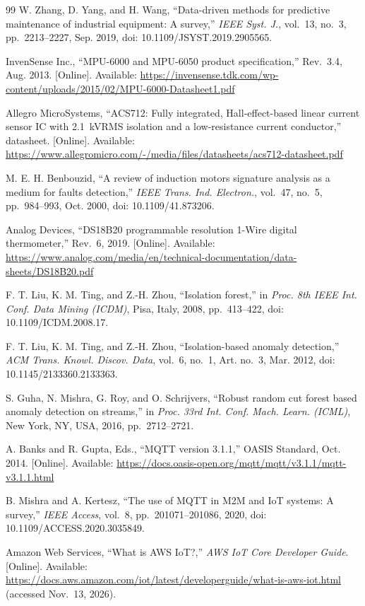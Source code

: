 \documentclass[10pt,twocolumn]{article}
\begin{document}
\begin{thebibliography}{99}
W. Zhang, D. Yang, and H. Wang, ``Data-driven methods for predictive maintenance of industrial
equipment: A survey,'' \emph{IEEE Syst. J.}, vol.~13, no.~3, pp.~2213--2227, Sep. 2019,
doi: 10.1109/JSYST.2019.2905565.

InvenSense Inc., ``MPU-6000 and MPU-6050 product specification,'' Rev.~3.4, Aug. 2013. [Online].
Available: \url{https://invensense.tdk.com/wp-content/uploads/2015/02/MPU-6000-Datasheet1.pdf}

Allegro MicroSystems, ``ACS712: Fully integrated, Hall-effect-based linear current sensor IC with
2.1~kVRMS isolation and a low-resistance current conductor,'' datasheet. [Online]. Available:
\url{https://www.allegromicro.com/-/media/files/datasheets/acs712-datasheet.pdf}

M. E. H. Benbouzid, ``A review of induction motors signature analysis as a medium for faults
detection,'' \emph{IEEE Trans. Ind. Electron.}, vol.~47, no.~5, pp.~984--993, Oct. 2000,
doi: 10.1109/41.873206.

Analog Devices, ``DS18B20 programmable resolution 1-Wire digital thermometer,'' Rev.~6, 2019.
[Online]. Available:
\url{https://www.analog.com/media/en/technical-documentation/data-sheets/DS18B20.pdf}

F. T. Liu, K. M. Ting, and Z.-H. Zhou, ``Isolation forest,'' in \emph{Proc. 8th IEEE Int. Conf.
Data Mining (ICDM)}, Pisa, Italy, 2008, pp.~413--422, doi: 10.1109/ICDM.2008.17.

F. T. Liu, K. M. Ting, and Z.-H. Zhou, ``Isolation-based anomaly detection,'' \emph{ACM Trans.
Knowl. Discov. Data}, vol.~6, no.~1, Art. no.~3, Mar. 2012, doi: 10.1145/2133360.2133363.

S. Guha, N. Mishra, G. Roy, and O. Schrijvers, ``Robust random cut forest based anomaly detection
on streams,'' in \emph{Proc. 33rd Int. Conf. Mach. Learn. (ICML)}, New York, NY, USA, 2016,
pp.~2712--2721.

A. Banks and R. Gupta, Eds., ``MQTT version 3.1.1,'' OASIS Standard, Oct. 2014. [Online].
Available: \url{https://docs.oasis-open.org/mqtt/mqtt/v3.1.1/mqtt-v3.1.1.html}

B. Mishra and A. Kertesz, ``The use of MQTT in M2M and IoT systems: A survey,'' \emph{IEEE
Access}, vol.~8, pp.~201071--201086, 2020, doi: 10.1109/ACCESS.2020.3035849.

Amazon Web Services, ``What is AWS IoT?,'' \emph{AWS IoT Core Developer Guide}. [Online].
Available: \url{https://docs.aws.amazon.com/iot/latest/developerguide/what-is-aws-iot.html}
(accessed Nov.~13, 2026).


\end{thebibliography}
\end{document}
